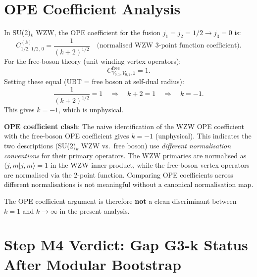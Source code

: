 \documentclass[12pt,a4paper]{article}
\theoremstyle{definition}
\theoremstyle{remark}
\begin{document}
\section{OPE Coefficient Analysis}
\label{sec:m4:ope}

In SU(2)$_k$ WZW, the OPE coefficient for the fusion
$j_1 = j_2 = 1/2 \to j_3 = 0$ is:
\begin{equation}
  C_{1/2,\,1/2,\,0}^{(k)} = \frac{1}{(k+2)^{1/2}}
  \quad \text{(normalised WZW 3-point function coefficient)}.
  \label{eq:m4:ope_coeff}
\end{equation}
For the free-boson theory (unit winding vertex operators):
\begin{equation}
  C_{V_{0,1}, V_{0,1}, \mathbf{1}}^{\text{free}} = 1.
  \label{eq:m4:ope_coeff_free}
\end{equation}
Setting these equal (UBT = free boson at self-dual radius):
\begin{equation}
  \frac{1}{(k+2)^{1/2}} = 1 \quad \Longrightarrow \quad k + 2 = 1 \quad \Longrightarrow \quad k = -1.
  \label{eq:m4:ope_clash}
\end{equation}
This gives $k = -1$, which is unphysical.

\begin{warnbox}
\textbf{OPE coefficient clash}: The naive identification of the WZW OPE
coefficient with the free-boson OPE coefficient gives $k = -1$ (unphysical).
This indicates the two descriptions (SU(2)$_k$ WZW vs.\ free boson) use
\emph{different normalisation conventions} for their primary operators.
The WZW primaries are normalised as $\langle j, m | j, m \rangle = 1$ in the
WZW inner product, while the free-boson vertex operators are normalised via
the 2-point function.  Comparing OPE coefficients across different normalisations
is not meaningful without a canonical normalisation map.
\end{warnbox}

The OPE coefficient argument is therefore \textbf{not} a clean discriminant
between $k = 1$ and $k \to \infty$ in the present analysis.

\section{Step M4 Verdict: Gap G3-k Status After Modular Bootstrap}
\label{sec:m4:verdict}
\end{document}
